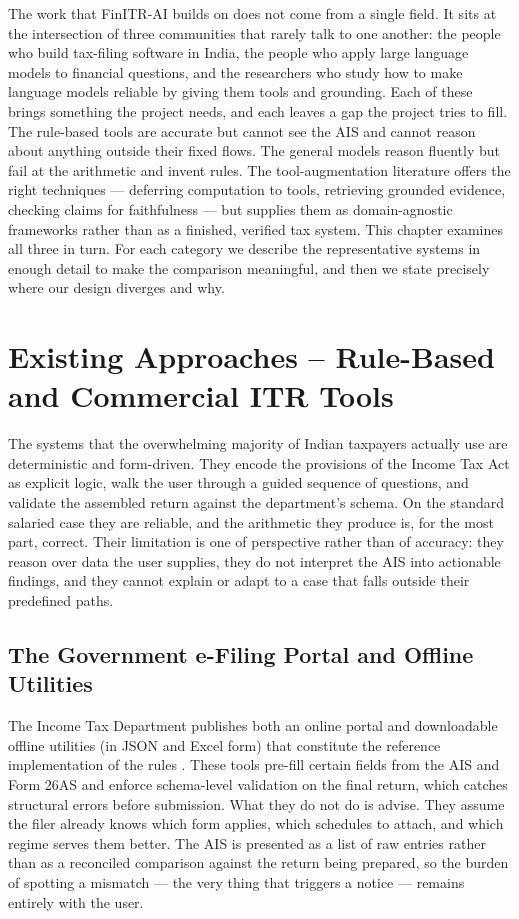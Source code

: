 \documentclass[12pt, a4paper, oneside]{report}
\begin{document}
The work that FinITR-AI builds on does not come from a single field. It sits at
the intersection of three communities that rarely talk to one another: the
people who build tax-filing software in India, the people who apply large
language models to financial questions, and the researchers who study how to
make language models reliable by giving them tools and grounding. Each of these
brings something the project needs, and each leaves a gap the project tries to
fill. The rule-based tools are accurate but cannot see the AIS and cannot reason
about anything outside their fixed flows. The general models reason fluently but
fail at the arithmetic and invent rules. The tool-augmentation literature offers
the right techniques --- deferring computation to tools, retrieving grounded
evidence, checking claims for faithfulness --- but supplies them as
domain-agnostic frameworks rather than as a finished, verified tax system. This
chapter examines all three in turn. For each category we describe the
representative systems in enough detail to make the comparison meaningful, and
then we state precisely where our design diverges and why.

\section{Existing Approaches -- Rule-Based and Commercial ITR Tools}
\label{sec:category-a}

The systems that the overwhelming majority of Indian taxpayers actually use are
deterministic and form-driven. They encode the provisions of the Income Tax Act
as explicit logic, walk the user through a guided sequence of questions, and
validate the assembled return against the department's schema. On the standard
salaried case they are reliable, and the arithmetic they produce is, for the
most part, correct. Their limitation is one of perspective rather than of
accuracy: they reason over data the user supplies, they do not interpret the AIS
into actionable findings, and they cannot explain or adapt to a case that falls
outside their predefined paths.

\subsection{The Government e-Filing Portal and Offline Utilities}
The Income Tax Department publishes both an online portal and downloadable
offline utilities (in JSON and Excel form) that constitute the reference
implementation of the rules \cite{ref1}. These tools pre-fill certain fields
from the AIS and Form 26AS and enforce schema-level validation on the final
return, which catches structural errors before submission. What they do not do
is advise. They assume the filer already knows which form applies, which
schedules to attach, and which regime serves them better. The AIS is presented
as a list of raw entries rather than as a reconciled comparison against the
return being prepared, so the burden of spotting a mismatch --- the very thing
that triggers a notice --- remains entirely with the user.
\end{document}
